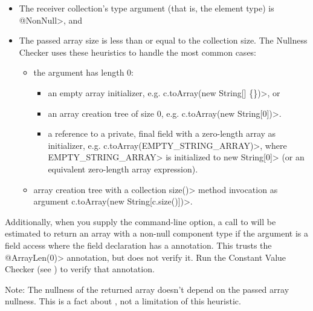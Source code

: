 \begin{itemize}
  \item The receiver collection's type argument (that is, the element type) is \<@NonNull>, and
  \item The passed array size is less than or equal to the collection size. The
    Nullness Checker uses these heuristics to handle the most common cases:

  \begin{itemize}
    \item the argument has length 0:

      \begin{itemize}
        \item an empty array initializer, e.g. \<c.toArray(new String[] \{\})>, or

        \item an array creation tree of size 0, e.g. \<c.toArray(new String[0])>.

        \item a reference to a private, final field with a zero-length array as initializer, e.g. \<c.toArray(EMPTY\_STRING\_ARRAY)>, where \<EMPTY\_STRING\_ARRAY> is initialized to \<new String[0]> (or an equivalent zero-length array expression).
      \end{itemize}

    \item array creation tree with a collection \<size()> method invocation as argument
      \<c.toArray(new String[c.size()])>.
  \end{itemize}

\end{itemize}

Additionally, when you supply the  command-line
option, a call to  will be estimated to return an array
with a non-null component type if the argument is a field access where the field
declaration has a 
annotation.
This trusts the \<@ArrayLen(0)> annotation, but does not verify it. Run the
Constant Value Checker (see ) to verify
that annotation.

Note: The nullness of the returned array doesn't depend on the passed array nullness.
This is a fact about
,
not a limitation of this heuristic.



